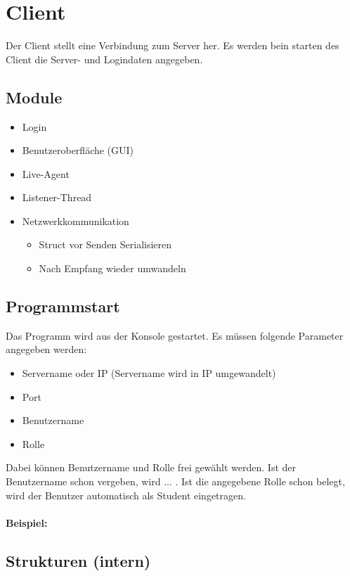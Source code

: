 \section{Client}
Der Client stellt eine Verbindung zum Server her. Es werden bein starten des Client die Server- und Logindaten angegeben.

\subsection{Module}
\begin{itemize}
	\item Login
	\item Benutzeroberfläche (GUI)
	\item Live-Agent
	\item Listener-Thread
	\item Netzwerkkommunikation
	\begin{itemize}
		\item Struct vor Senden Serialisieren
		\item Nach Empfang wieder umwandeln
	\end{itemize}
\end{itemize}

\subsection{Programmstart}
Das Programm wird aus der Konsole gestartet. Es müssen folgende Parameter angegeben werden:
\begin{itemize}
	\item Servername oder IP (Servername wird in IP umgewandelt)
	\item Port
	\item Benutzername
	\item Rolle
\end{itemize}

Dabei können Benutzername und Rolle frei gewählt werden. Ist der Benutzername schon vergeben, wird ... . Ist die angegebene Rolle schon belegt, wird der Benutzer automatisch als Student eingetragen.

\paragraph{Beispiel:}

\subsection{Strukturen (intern)}
